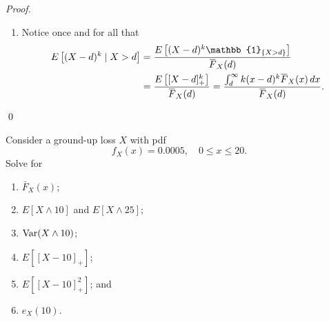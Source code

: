 \documentclass[notoc,notitlepage]{tufte-book}
\begin{document}
\begin{proof}
\begin{enumerate}
    \item Notice once and for all that
      \begin{align*}
        E \left[ (X - d)^k \mid X > d \right] &= \frac{E \left[ (X - d)^k \mathbb{1}_{\{ X > d \}} \right]}{\bar{F}_X(d)} \\
                                              &= \frac{E \left[ [ X - d ]_+^k \right]}{\bar{F}_X(d)} = \frac{\int_{d}^{\infty} k (x - d)^k \bar{F}_X(x) \dif{x}}{\bar{F}_X(d)}.
      \end{align*}
  \end{enumerate}\qed\
\end{proof}

\begin{eg}
  Consider a ground-up loss $X$ with pdf
  \begin{equation*}
    f_X(x) = 0.0005, \quad 0 \leq x \leq 20.
  \end{equation*}
  Solve for
  \begin{enumerate}
    \item $\bar{F}_X(x)$;
    \item $E [ X \land 10 ]$ and $E[ X \land 25 ]$;
    \item $\operatorname{Var}(X \land 10)$;
    \item $E \left[ [ X - 10 ]_+ \right]$;
    \item $E \left[ [ X - 10 ]_+^2 \right]$; and
    \item $e_X(10)$.
  \end{enumerate}
\end{eg}
\end{document}
